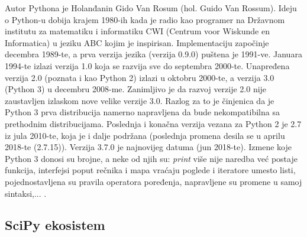 \documentclass[12pt,oneside]{memoir}
\begin{document}
Autor Pythona je Holanđanin Gido Van Rosum (hol. Guido Van Rossum). Ideju o Python-u dobija krajem 1980-ih kada je radio kao programer na Državnom institutu za matematiku i informatiku CWI (Centrum voor Wiskunde en Informatica) u jeziku ABC kojim je inspirisan. Implementaciju započinje decembra 1989-te, a prva verzija jezika (verzija 0.9.0) puštena je 1991-ve. Januara 1994-te izlazi verzija 1.0 koja se razvija sve do septembra 2000-te. Unapređena verzija 2.0 (poznata i kao Python 2) izlazi u oktobru 2000-te, a verzija 3.0 (Python 3) u decembru 2008-me. Zanimljivo je da razvoj verzije 2.0 nije zaustavljen izlaskom nove velike verzije 3.0. Razlog za to je činjenica da je Python 3 prva distribucija namerno napravljena da bude nekompatibilna sa prethodnim distribucijama. Poslednja i konačna verzija vezana za Python 2 je 2.7 iz jula 2010-te, koja je i dalje podržana (poslednja promena desila se u aprilu 2018-te (2.7.15)). Verzija 3.7.0 je najnovijeg datuma (jun 2018-te). Izmene koje Python 3 donosi su brojne, a neke od njih su: \textit{print} više nije naredba već postaje funkcija, interfejsi poput rečnika i mapa vraćaju poglede i iteratore umesto listi, pojednostavljena su pravila operatora poređenja, napravljene su promene u samoj sintaksi,...  \cite{python-history, python-dates, python-whats-new}.

\subsection{SciPy ekosistem}
 
\end{document}
